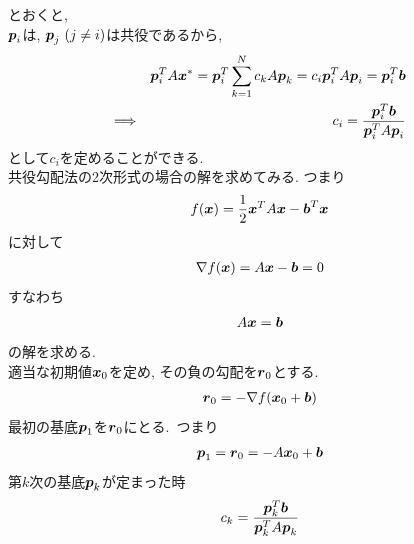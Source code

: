 \documentclass[dvipdfmx,a4j]{jsarticle}
\begin{document}
                とおくと, \\
                $\mbox{\boldmath $p$}_{i}$は, $\mbox{\boldmath $p$}_{j}\ (j\neq i)$は共役であるから,
                \begin{eqnarray*}
                  &&\mbox{\boldmath $p$}_{i}^{T}A\mbox{\boldmath $x$}^{*}=\mbox{\boldmath $p$}_{i}^{T}\sum_{k=1}^{N}c_{k}A\mbox{\boldmath $p$}_{k}=c_{i}\mbox{\boldmath $p$}_{i}^{T}A\mbox{\boldmath $p$}_{i}=\mbox{\boldmath $p$}_{i}^{T}\mbox{\boldmath $b$}\\
                  \Longrightarrow&&\ c_{i}=\frac{\mbox{\boldmath $p$}_{i}^{T}\mbox{\boldmath $b$}}{\mbox{\boldmath $p$}_{i}^{T}A\mbox{\boldmath $p$}_{i}}
                \end{eqnarray*}
                として$c_{i}$を定めることができる.\\[0.5cm]
                共役勾配法の2次形式の場合の解を求めてみる. つまり
                \begin{eqnarray*}
                  f(\mbox{\boldmath $x$})=\frac{1}{2}\mbox{\boldmath $x$}^{T}A\mbox{\boldmath $x$}-\mbox{\boldmath $b$}^{T}\mbox{\boldmath $x$}
                \end{eqnarray*}
       に対して
       \begin{eqnarray*}
         \nabla f(\mbox{\boldmath $x$})=A\mbox{\boldmath $x$}-\mbox{\boldmath $b$}=0
       \end{eqnarray*}
       すなわち
       \begin{eqnarray*}
         A\mbox{\boldmath $x$}=\mbox{\boldmath $b$}
       \end{eqnarray*}
       の解を求める.\\
       適当な初期値$\mbox{\boldmath $x$}_{0}$を定め, その負の勾配を$\mbox{\boldmath $r$}_{0}$とする.
       \begin{eqnarray*}
         \mbox{\boldmath $r$}_{0}=-\nabla f(\mbox{\boldmath $x$}_{0}+\mbox{\boldmath $b$})
       \end{eqnarray*}
       最初の基底$\mbox{\boldmath $p$}_{1}$を$\mbox{\boldmath $r$}_{0}$にとる.\ つまり
       \begin{eqnarray*}
         \mbox{\boldmath $p$}_{1}=\mbox{\boldmath $r$}_{0}=-A\mbox{\boldmath $x$}_{0}+\mbox{\boldmath $b$}
       \end{eqnarray*}
       第$k$次の基底$\mbox{\boldmath $p$}_{k}$が定まった時
       \begin{eqnarray*}
         c_{k}=\frac{\mbox{\boldmath $p$}_{k}^{T}\mbox{\boldmath $b$}}{\mbox{\boldmath $p$}_{k}^{T}A\mbox{\boldmath $p$}_{k}}
       \end{eqnarray*}
\end{document}
